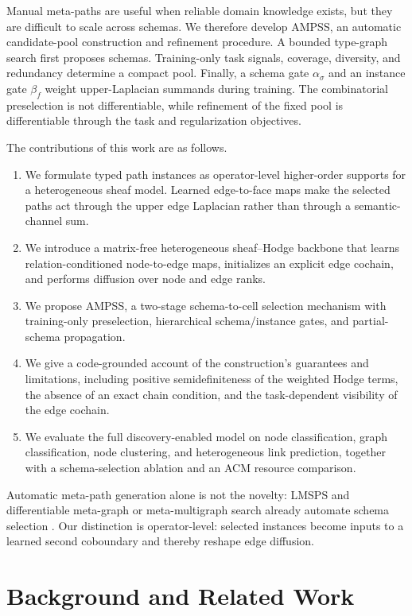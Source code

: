 \documentclass{article}
\newcommand{\ampss}{\textsc{AMPSS}}
\begin{document}
Manual meta-paths are useful when reliable domain knowledge exists, but they are difficult to
scale across schemas. We therefore develop \ampss, an automatic candidate-pool construction and
refinement procedure. A bounded type-graph search first proposes schemas. Training-only task
signals, coverage, diversity, and redundancy determine a compact pool. Finally, a schema gate
$\alpha_\sigma$ and an instance gate $\beta_f$ weight upper-Laplacian summands during training. The
combinatorial preselection is not differentiable, while refinement of the fixed pool is
differentiable through the task and regularization objectives.

The contributions of this work are as follows.
\begin{enumerate}
  \item We formulate typed path instances as operator-level higher-order supports for a
  heterogeneous sheaf model. Learned edge-to-face maps make the selected paths act through the
  upper edge Laplacian rather than through a semantic-channel sum.
  \item We introduce a matrix-free heterogeneous sheaf--Hodge backbone that learns
  relation-conditioned node-to-edge maps, initializes an explicit edge cochain, and performs
  diffusion over node and edge ranks.
  \item We propose \ampss, a two-stage schema-to-cell selection mechanism with training-only
  preselection, hierarchical schema/instance gates, and partial-schema propagation.
  \item We give a code-grounded account of the construction's guarantees and limitations,
  including positive semidefiniteness of the weighted Hodge terms, the absence of an exact chain
  condition, and the task-dependent visibility of the edge cochain.
  \item We evaluate the full discovery-enabled model on node classification, graph classification,
  node clustering, and heterogeneous link prediction, together with a schema-selection ablation
  and an ACM resource comparison.
\end{enumerate}

Automatic meta-path generation alone is not the novelty: LMSPS and differentiable meta-graph or
meta-multigraph search already automate schema selection \citep{yan2024lmsps,jiang2022pmmm}. Our
distinction is operator-level: selected instances become inputs to a learned second coboundary and
thereby reshape edge diffusion.

\section{Background and Related Work}
\label{sec:background}
\end{document}
